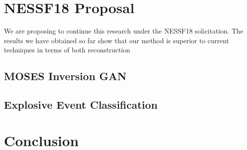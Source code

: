 \documentclass[10pt,letterpaper]{article}
\begin{document}
	\section{NESSF18 Proposal}
	
		We are proposing to continue this research under the NESSF18 solicitation.
		The results we have obtained so far show that our method is superior to current techniques in terms of both reconstruction 
	
		\subsection{MOSES Inversion GAN} \label{sec_gan}
		
		
		\subsection{Explosive Event Classification}
		

	
	\section{Conclusion}
	
	
	
	\begin{landscape}
		
	\end{landscape}
	
\end{document}
